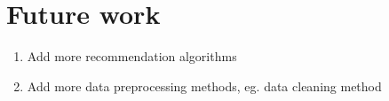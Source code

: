 \documentclass{article}
\begin{document}
\pagebreak
\section{Future work}
\begin{enumerate}
\item Add more recommendation algorithms 
\item Add more data preprocessing methods, eg. data cleaning method
\end{enumerate}



\end{document}
